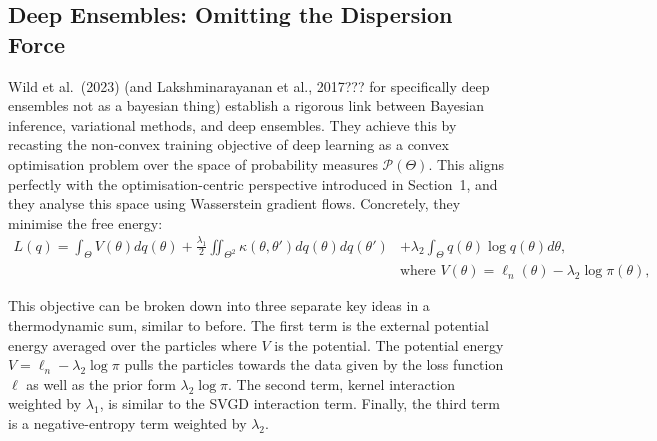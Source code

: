 \documentclass[mstat,12pt]{unswthesis}
\newcommand{\add}[1]{{\color{red}#1}}
\begin{document}

\subsection{Deep Ensembles: Omitting the Dispersion Force}

Wild et al.~(2023) \add{(and Lakshminarayanan et al., 2017??? for specifically deep ensembles not as a bayesian thing)} establish a rigorous link between Bayesian inference, variational methods, and deep ensembles. They achieve this by recasting the non-convex training objective of deep learning as a convex optimisation problem over the space of probability measures $\mathcal{P}(\Theta)$. This aligns perfectly with the optimisation-centric perspective introduced in Section~1, and they analyse this space using Wasserstein gradient flows. Concretely, they minimise the free energy:
\begin{equation}
    \begin{split}
        L(q) = \int_\Theta V(\theta)dq(\theta)
        + \frac{\lambda_1}{2}\iint_{\Theta^2} \kappa(\theta,\theta')dq(\theta)dq(\theta')
         & + \lambda_2\int_\Theta q(\theta)\log q(\theta)d\theta,               \\
         & \text{where } V(\theta) = \ell_n(\theta) - \lambda_2\log\pi(\theta),
    \end{split}
    \label{eq:freeenergy}
\end{equation}

This objective can be broken down into three separate key ideas in a thermodynamic sum, similar to before. The first term is the external potential energy averaged over the particles where $V$ is the potential. The potential energy $V = \ell_n - \lambda_2\log\pi$ pulls the particles towards the data given by the loss function $\ell$ as well as the prior form $\lambda_2\log\pi$. The second term, kernel interaction weighted by $\lambda_1$, is similar to the SVGD interaction term. Finally, the third term is a negative-entropy term weighted by $\lambda_2$.
\end{document}
